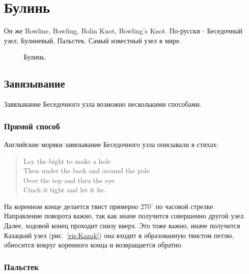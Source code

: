 \section{Булинь}

Он же Bowline, Bowling, Bolin Knot, Bowling’s Knot. По-русски - Беседочный узел, Булиневый, Пальстек. Самый известный узел в мире.

\begin{figure}[H]\centering
	\begin{minipage}{1\linewidth}
		\begin{center}
			\tcbox[enhanced jigsaw,colframe=black,opacityframe=0.5,opacityback=0.5]
			{\centering{}}
		\end{center}
	\end{minipage}
\caption{Булинь.}
\label{ris:Besedochny}
\end{figure}

\subsection{Завязывание}\label{sec:Zavyazyvanie_bowline}

Завязывание Беседочного узла возможно несколькими способами.

\subsubsection*{Прямой способ}

Английские моряки завязывание Беседочного узла описывали в стихах:

\begin{verse}
Lay the bight to make a hole \\
Then under the back and around the pole \\
Over the top and thru the eye \\
Cinch it tight and let it lie.
\end{verse}


На коренном конце делается твист примерно $270^{\circ}$ по часовой стрелке. Направление поворота важно, так как иначе получится совершенно другой узел. Далее, ходовой конец проходит снизу вверх. Это тоже важно, иначе получится Казацкий узел (рис.~\ref{ris:Kazak}) она входит в образованную твистом петлю, обносится вокруг коренного конца и возвращается обратно.

\subsubsection*{Пальстек}

